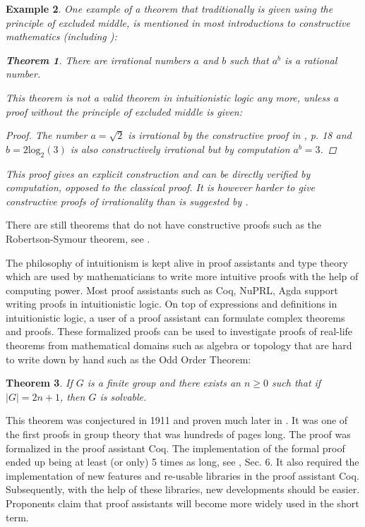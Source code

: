 \documentclass[12pt,a4paper,twoside,xetex]{book} %
\newtheorem{theorem}{Theorem}[section]
\newtheorem{example}[theorem]{Example}
\begin{document}
\begin{example}

One example of a theorem that traditionally is given using the principle of excluded middle, is mentioned in most introductions to constructive mathematics (including \cite{Palmgren2014}):

\begin{theorem}
  There are irrational numbers $a$ and $b$ such that $a^b$ is a rational number.
\end{theorem} 

This theorem is not a valid theorem in intuitionistic logic any more, unless a proof without the principle of excluded middle is given:

\begin{proof}
The number $a = \sqrt{2}$ is irrational by the constructive proof in \cite{Rosenblatt1983}, p. 18 and $b=2\text{log}_2(3)$ is also constructively irrational but by computation $a^b=3$.
\end{proof}

This proof gives an explicit construction and can be directly verified by computation, opposed to the classical proof. It is however harder to give constructive proofs of  irrationality than is suggested by \cite{Bauer2009}.

\end{example}

There are still theorems that do not have constructive proofs such as the Robertson-Symour theorem, see \cite{BIENSTOCK1995481}.

The philosophy of intuitionism is kept alive in proof assistants and type theory which are used by mathematicians to write more intuitive proofs with the help of computing power. Most proof assistants such as Coq, NuPRL, Agda support writing proofs in intuitionistic logic. On top of expressions and definitions in intuitionistic logic, a user of a proof assistant can formulate complex theorems and proofs. These formalized proofs can be used to investigate proofs of real-life theorems from mathematical domains such as algebra or topology that are hard to write down by hand such as the Odd Order Theorem:

\begin{theorem}\label{solvable}
If $G$ is a finite group and there exists an $n \geq 0$ such that if $|G| = 2n+1$, then $G$ is solvable.
\end{theorem}

This theorem was conjectured in 1911 and proven much later in \cite{Feit1963}. It was one of the first proofs in group theory that was hundreds of pages long. The proof was formalized in the proof assistant Coq. The implementation of the formal proof ended up being at least (or only) 5 times as long, see \cite{Gonthier2013}, Sec. 6. It also required the implementation of new features and re-usable libraries in the proof assistant Coq. Subsequently, with the help of these libraries, new developments should be easier. Proponents claim that proof assistants will become more widely used in the short term.
\end{document}
